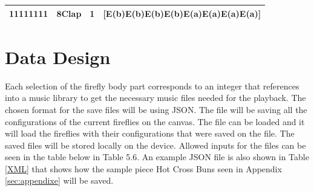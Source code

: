 \begin{table}
\begin{tabular}{|l|l|l|l|}
\hline
11111111                                                                                               & 8Clap                                                                                                          & 1                                                                                                & {[}E(b)E(b)E(b)E(b)E(a)E(a)E(a)E(a)]                                                                                                             \\
\hline
\end{tabular}
\end{table}

\section{Data Design}
Each selection of the firefly body part corresponds to an integer that references into a music library to get the necessary music files needed for the playback. The chosen format for the save files will be using JSON. The file will be saving all the configurations of the current fireflies on the canvas. The file can be loaded and it will load the fireflies with their configurations that were saved on the file. The saved files will be stored locally on the device. Allowed inputs for the files can be seen in the table below in Table 5.6. An example JSON file is also shown in Table \ref{XML} that shows how the sample piece Hot Cross Buns seen in Appendix \ref{sec:appendixe} will be saved.


